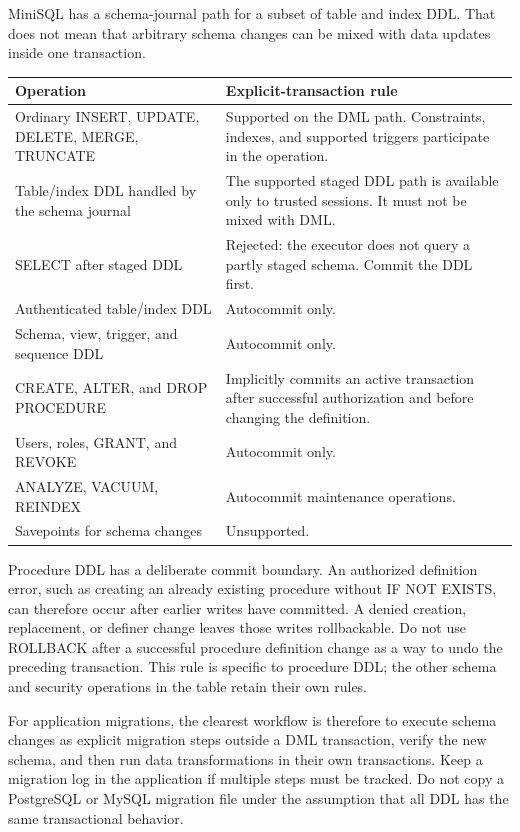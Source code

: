 MiniSQL has a schema-journal path for a subset of table and index DDL. That
does not mean that arbitrary schema changes can be mixed with data updates
inside one transaction.

\begin{longtable}{p{.34\linewidth}p{.59\linewidth}}
\toprule
Operation & Explicit-transaction rule \\
\midrule
\endhead
Ordinary INSERT, UPDATE, DELETE, MERGE, TRUNCATE & Supported on the DML path.
Constraints, indexes, and supported triggers participate in the operation. \\
Table/index DDL handled by the schema journal & The supported staged DDL path
is available only to trusted sessions. It must not be mixed with DML. \\
SELECT after staged DDL & Rejected: the executor does not query a partly
staged schema. Commit the DDL first. \\
Authenticated table/index DDL & Autocommit only. \\
Schema, view, trigger, and sequence DDL & Autocommit only. \\
CREATE, ALTER, and DROP PROCEDURE & Implicitly commits an active transaction
after successful authorization and before changing the definition. \\
Users, roles, GRANT, and REVOKE & Autocommit only. \\
ANALYZE, VACUUM, REINDEX & Autocommit maintenance operations. \\
Savepoints for schema changes & Unsupported. \\
\bottomrule
\end{longtable}

Procedure DDL has a deliberate commit boundary. An authorized definition
error, such as creating an already existing procedure without IF NOT EXISTS,
can therefore occur after earlier writes have committed. A denied creation,
replacement, or definer change leaves those writes rollbackable. Do not use
ROLLBACK after a successful procedure definition change as a way to undo the
preceding transaction. This rule is specific to procedure DDL; the other
schema and security operations in the table retain their own rules.

For application migrations, the clearest workflow is therefore to execute
schema changes as explicit migration steps outside a DML transaction, verify
the new schema, and then run data transformations in their own transactions.
Keep a migration log in the application if multiple steps must be tracked.
Do not copy a PostgreSQL or MySQL migration file under the assumption that all
DDL has the same transactional behavior.

